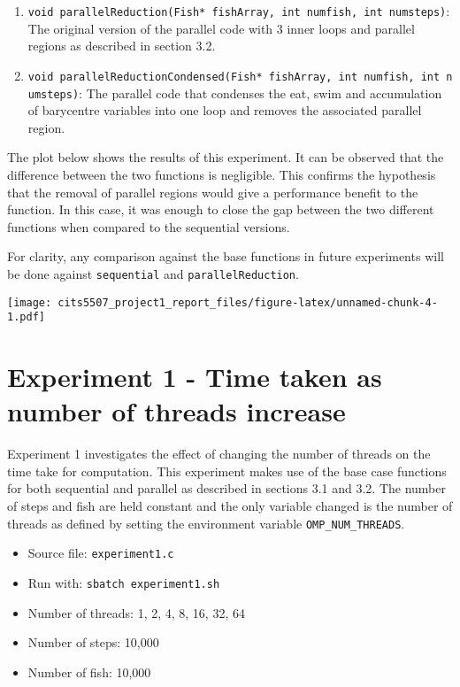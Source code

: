 \documentclass[
]{article}
\providecommand{\tightlist}{%
  \setlength{\itemsep}{0pt}\setlength{\parskip}{0pt}}
\begin{document}
\begin{enumerate}
\def\labelenumi{\arabic{enumi}.}
\item
  \texttt{void\ parallelReduction(Fish*\ fishArray,\ int\ numfish,\ int\ numsteps)}:
  The original version of the parallel code with 3 inner loops and
  parallel regions as described in section 3.2.
\item
  \texttt{void\ parallelReductionCondensed(Fish*\ fishArray,\ int\ numfish,\ int\ numsteps)}:
  The parallel code that condenses the eat, swim and accumulation of
  barycentre variables into one loop and removes the associated parallel
  region.
\end{enumerate}

The plot below shows the results of this experiment. It can be observed
that the difference between the two functions is negligible. This
confirms the hypothesis that the removal of parallel regions would give
a performance benefit to the function. In this case, it was enough to
close the gap between the two different functions when compared to the
sequential versions.

For clarity, any comparison against the base functions in future
experiments will be done against \texttt{sequential} and
\texttt{parallelReduction}.

\texttt{[image: cits5507\_project1\_report\_files/figure-latex/unnamed-chunk-4-1.pdf]}

\hypertarget{experiment-1---time-taken-as-number-of-threads-increase}{%
\section{Experiment 1 - Time taken as number of threads
increase}\label{experiment-1---time-taken-as-number-of-threads-increase}}

Experiment 1 investigates the effect of changing the number of threads
on the time take for computation. This experiment makes use of the base
case functions for both sequential and parallel as described in sections
3.1 and 3.2. The number of steps and fish are held constant and the only
variable changed is the number of threads as defined by setting the
environment variable \texttt{OMP\_NUM\_THREADS}.

\begin{itemize}
\tightlist
\item
  Source file: \texttt{experiment1.c}
\item
  Run with: \texttt{sbatch\ experiment1.sh}
\item
  Number of threads: 1, 2, 4, 8, 16, 32, 64
\item
  Number of steps: 10,000
\item
  Number of fish: 10,000
\end{itemize}
\end{document}
